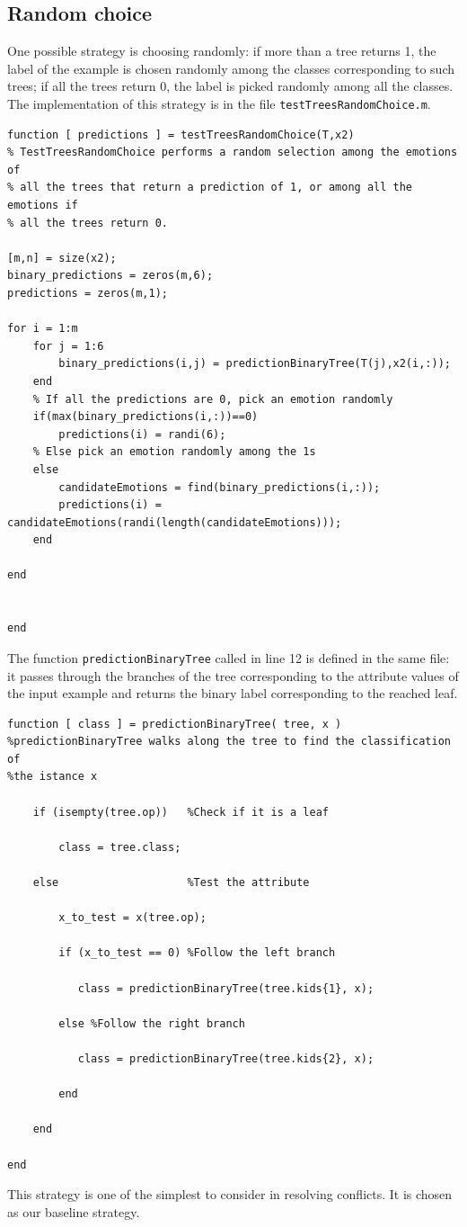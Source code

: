 \documentclass{article}
\begin{document}
\subsection{Random choice}
One possible strategy is choosing randomly: if more than a tree returns 1, the label of the example is chosen randomly among the classes corresponding to such trees; if all the trees return 0, the label is picked randomly among all the classes.\\
The implementation of this strategy is in the file \verb$testTreesRandomChoice.m$.
\begin{lstlisting}
function [ predictions ] = testTreesRandomChoice(T,x2)
% TestTreesRandomChoice performs a random selection among the emotions of
% all the trees that return a prediction of 1, or among all the emotions if
% all the trees return 0.

[m,n] = size(x2);
binary_predictions = zeros(m,6);
predictions = zeros(m,1);

for i = 1:m
    for j = 1:6
        binary_predictions(i,j) = predictionBinaryTree(T(j),x2(i,:));
    end
    % If all the predictions are 0, pick an emotion randomly
    if(max(binary_predictions(i,:))==0)
        predictions(i) = randi(6);
    % Else pick an emotion randomly among the 1s
    else
        candidateEmotions = find(binary_predictions(i,:));
        predictions(i) = candidateEmotions(randi(length(candidateEmotions)));
    end
    
end


end
\end{lstlisting}
The function \verb$predictionBinaryTree$ called in line 12 is defined in the same file: it passes through the branches of the tree corresponding to the attribute values of the input example and returns the binary label corresponding to the reached leaf.
\begin{lstlisting}[firstnumber=28]
function [ class ] = predictionBinaryTree( tree, x )
%predictionBinaryTree walks along the tree to find the classification of
%the istance x
    
    if (isempty(tree.op))   %Check if it is a leaf
        
        class = tree.class;
        
    else                    %Test the attribute
        
        x_to_test = x(tree.op);
        
        if (x_to_test == 0) %Follow the left branch
           
           class = predictionBinaryTree(tree.kids{1}, x);
            
        else %Follow the right branch
            
           class = predictionBinaryTree(tree.kids{2}, x);
            
        end
        
    end

end
\end{lstlisting}
This strategy is one of the simplest to consider in resolving conflicts. It is chosen as our baseline strategy.
\end{document}
